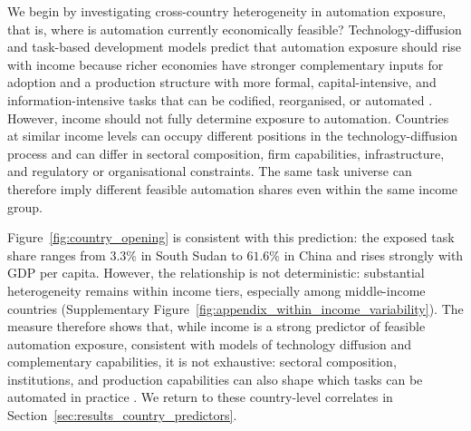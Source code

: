 \documentclass[11pt]{article}
\begin{document}
We begin by investigating cross-country heterogeneity in automation exposure, that is, where is automation currently economically feasible? Technology-diffusion and task-based development models predict that automation exposure should rise with income because richer economies have stronger complementary inputs for adoption and a production structure with more formal, capital-intensive, and information-intensive tasks that can be codified, reorganised, or automated \citep{CominHobijn2010,CominMestieri2018TechnologyIncomeDivergence,CaunedoKellerShin2021,CireraCominCruz2024,LewandowskiMadonPark2025DevelopmentStages}. However, income should not fully determine exposure to automation. Countries at similar income levels can occupy different positions in the technology-diffusion process and can differ in sectoral composition, firm capabilities, infrastructure, and regulatory or organisational constraints. The same task universe can therefore imply different feasible automation shares even within the same income group.

Figure~\ref{fig:country_opening} is consistent with this prediction: the exposed task share ranges from $3.3\%$ in South Sudan to $61.6\%$ in China and rises strongly with GDP per capita. However, the relationship is not deterministic: substantial heterogeneity remains within income tiers, especially among middle-income countries (Supplementary Figure~\ref{fig:appendix_within_income_variability}). The measure therefore shows that, while income is a strong predictor of feasible automation exposure, consistent with models of technology diffusion and complementary capabilities, it is not exhaustive: sectoral composition, institutions, and production capabilities can also shape which tasks can be automated in practice \citep{CominMestieri2018TechnologyIncomeDivergence,CireraCominCruz2024,LewandowskiMadonPark2025DevelopmentStages}. We return to these country-level correlates in Section~\ref{sec:results_country_predictors}.
\end{document}
